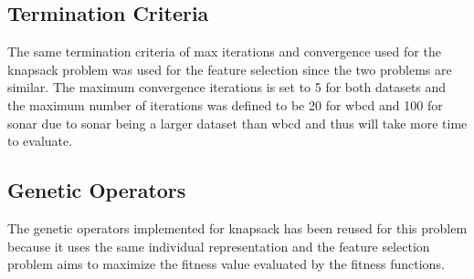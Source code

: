 \documentclass{article}
\begin{document}
\subsection*{Termination Criteria}
The same termination criteria of max iterations and convergence used for the knapsack problem was used for the feature selection since the two problems are similar. The maximum convergence iterations is set to 5 for both datasets and the maximum number of iterations was defined to be 20 for wbcd and 100 for sonar due to sonar being a larger dataset than wbcd and thus will take more time to evaluate. \par
\subsection*{Genetic Operators}
The genetic operators implemented for knapsack has been reused for this problem because it uses the same individual representation and the feature selection problem aims to maximize the fitness value evaluated by the fitness functions. \par
\end{document}
